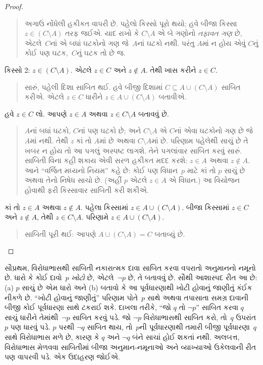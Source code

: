 \begin{proof}
\begin{quote}
    અગાઉ નોંધેલી હકીકત વાપરી છે. પહેલો કિસ્સો પૂરો થયો;
    હવે બીજા કિસ્સા $z \in (C
    \setminus A)$ તરફ જઈએ. યાદ રાખો કે $C \setminus A$ એ
    બે ગણોનો \emph{તફાવત ગણ} છે, એટલે~$C$નાં એ બધાં
    ઘટકોનો ગણ જે~$A$નાં ઘટકો નથી. પરંતુ
    $A$માં ન હોય એવું $C$નું કોઈ પણ ઘટક,~$C$નું
    ઘટક તો છે જ.
  \end{quote}
  કિસ્સો 2: $z \in (C \setminus A)$. એટલે $z \in C$ અને
  $z
  \notin A$. તેથી ખાસ કરીને $z \in C$.
  \begin{quote}
    સારું, પહેલી દિશા સાબિત થઈ. હવે બીજી દિશામાં
    $C \subseteq A \cup (C \setminus
    A)$ સાબિત કરીએ. એટલે $z \in C$ ધારીને $z \in A \cup (C
    \setminus A)$ બતાવીએ.
  \end{quote}
  હવે $z \in C$ લો. આપણે $z \in A$ અથવા $z \in C
  \setminus A$ બતાવવું છે.
  \begin{quote}
    $A$નાં બધાં ઘટકો, $C$નાં પણ ઘટકો છે;
    અને $C
    \setminus A$ એ $C$નાં એવા ઘટકોનો ગણ છે જે
    $A$માં નથી. તેથી $z$ કાં તો $A$માં છે અથવા $C
    \setminus A$માં છે. પરિણામ પહેલેથી સાચું છે તે ખબર ન હોય
    તો આ પગલું અસ્પષ્ટ લાગશે. તેને પગલાંવાર સાબિત કરવું સારું.
    સાબિતી વિના કહી શકાય એવી સરળ હકીકત મદદ કરશે:
    $z \in A$ અથવા $z \notin A$. આને ``વર્જિત મધ્યનો નિયમ''
    કહે છે: કોઈ પણ વિધાન~$p$ માટે કાં તો $p$ સાચું છે અથવા
    તેનો નિષેધ સાચો છે. (અહીં $p$ એટલે $z \in A$ એ વિધાન.)
    આ વિયોજન હોવાથી ફરી કિસ્સાવાર સાબિતી કરી શકીએ.
  \end{quote}
  કાં તો $z \in A$ અથવા $z \notin A$. પહેલા કિસ્સામાં
  $z \in A \cup
  (C \setminus A)$. બીજા કિસ્સામાં $z \in C$ અને
  $z \notin A$, તેથી $z \in C \setminus A$. પરિણામે
  $z \in A \cup (C \setminus A)$.
  \begin{quote}
    સાબિતી પૂરી થઈ: આપણે $A \cup (C \setminus A) = C$ બતાવ્યું છે.
  \end{quote}
\end{proof}
\endgroup


\begingroup
\makeatletter{}\makeatother


\label{guunit:OLP-0609}


સૌપ્રથમ, વિરોધાભાસથી સાબિતી નકારાત્મક દાવા સાબિત કરવા વપરાતો
અનુમાનનો નમૂનો છે. ધારો કે કોઈ દાવો~$p$ \emph{ખોટો} છે,
એટલે~$\lnot p$ છે, તે બતાવવું છે. સૌથી આશાસ્પદ રીત આ છે:
(a) $p$ સાચું છે એમ ધારો અને (b) બતાવો કે આ પૂર્વધારણાથી
ખોટી હોવાનું જાણીતું કંઈક નીકળે છે. ``ખોટી હોવાનું જાણીતું''
પરિણામ પોતે~$p$ સાથે અથવા તપાસાતા સમગ્ર દાવાની બીજી કોઈ
પૂર્વધારણા સાથે ટકરાઈ શકે. દાખલા તરીકે, ``જો $q$ તો $\lnot p$''
સાબિત કરવા $q$ સાચું ધારીને તેમાંથી~$\lnot
p$ સાબિત કરવું પડે. જો $\lnot p$ વિરોધાભાસથી સાબિત કરો,
તો~$q$ ઉપરાંત $p$ પણ ધારવું પડે. $p$ પરથી $\lnot q$
સાબિત થાય, તો~$p$ની પૂર્વધારણાથી તમારી બીજી પૂર્વધારણા~$q$
સાથે વિરોધાભાસ મળે છે, કારણ કે $q$ અને $\lnot q$ બંને
સાચાં હોઈ શકતાં નથી. અલબત્ત, વિરોધાભાસ મેળવવા સાબિતીમાં
બીજા અનુમાન-નમૂનાઓ અને વ્યાખ્યાઓ ઉકેલવાની રીત પણ વાપરવી
પડે. એક ઉદાહરણ જોઈએ.

